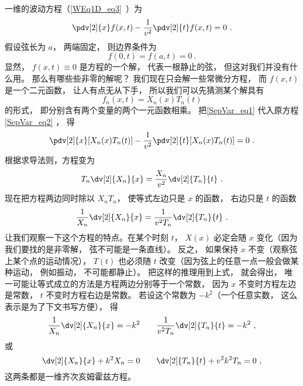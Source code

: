一维的波动方程（\autoref{WEq1D_eq3}~）为
\begin{equation}
\pdv[2]{x} f(x, t) - \frac{1}{v^2} \pdv[2]{t}f(x, t) = 0~.
\end{equation}
假设弦长为 $a$， 两端固定， 则边界条件为
\begin{equation}\label{SepVar_eq3}
f(0, t) = f(a, t) = 0~.
\end{equation}
显然， $f(x, t) \equiv 0$ 是方程的一个解， 代表一根静止的弦， 但这对我们并没有什么用。 那么有哪些些非零的解呢？ 我们现在只会解一些常微分方程， 而 $f(x, t)$ 是一个二元函数， 让人有点无从下手， 所以我们可以先猜测某个解具有
\begin{equation}\label{SepVar_eq1}
f_n(x, t) = X_n(x) T_n(t)
\end{equation}
的形式， 即分别含有两个变量的两个一元函数相乘。 把\autoref{SepVar_eq1} 代入原方程\autoref{SepVar_eq2} ， 得
\begin{equation}
\pdv[2]{x}[X_n(x)T_n(t)] - \frac{1}{v^2}\pdv[2]{t} [X_n(x) T_n(t)] = 0~.
\end{equation}
根据求导法则，方程变为
\begin{equation}
T_n\dv[2]{X_n}{x} = \frac{X_n}{v^2} \dv[2]{T_n}{t}~.
\end{equation}
现在把方程两边同时除以 $X_nT_n$， 使等式左边只是 $x$ 的函数， 右边只是 $t$ 的函数
\begin{equation}
\frac{1}{X_n}\dv[2]{X_n}{x} = \frac{1}{v^2 T_n} \dv[2]{T_n}{t}~.
\end{equation}
让我们观察一下这个方程的特点。在某个时刻 $t$， $X(x)$ 必定会随 $x$ 变化（因为我们要找的是非零解， 弦不可能是一条直线）。 反之， 如果保持 $x$ 不变（观察弦上某个点的运动情况）， $T(t)$ 也必须随 $t$ 改变（因为弦上的任意一点一般会做某种运动， 例如振动， 不可能都静止）。 把这样的推理用到上式， 就会得出， 唯一可能让等式成立的方法是方程两边分别等于一个常数， 因为 $x$ 不变时方程左边是常数，  $t$ 不变时方程右边是常数。 若设这个常数为 $-k^2$（一个任意实数， 这么表示是为了下文书写方便）， 得
\begin{equation}
\frac{1}{X_n}\dv[2]{X_n}{x} = -k^2
\qquad
\frac{1}{v^2 T_n}\dv[2]{T_n}{t} = -k^2~,
\end{equation}
或
\begin{equation}
\dv[2]{X_n}{x} + k^2 X_n = 0
\qquad
\dv[2]{T_n}{t} + v^2k^2 T_n = 0~,
\end{equation}
这两条都是一维齐次亥姆霍兹方程。

